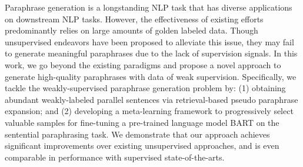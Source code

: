 Paraphrase generation is a longstanding NLP task that has diverse applications on downstream NLP tasks. However, the effectiveness of existing efforts predominantly relies on large amounts of golden labeled data. Though unsupervised endeavors have been proposed to alleviate this issue, they may fail to generate meaningful paraphrases due to the lack of supervision signals. In this work, we go beyond the existing paradigms and propose a novel approach to generate high-quality paraphrases with data of weak supervision. Specifically, we tackle the weakly-supervised paraphrase generation problem by: (1) obtaining abundant weakly-labeled parallel sentences via retrieval-based pseudo paraphrase expansion; and (2) developing a meta-learning framework to progressively select valuable samples for fine-tuning a pre-trained language model BART on the sentential paraphrasing task. We demonstrate that our approach achieves significant improvements over existing unsupervised approaches, and is even comparable in performance with supervised state-of-the-arts.
